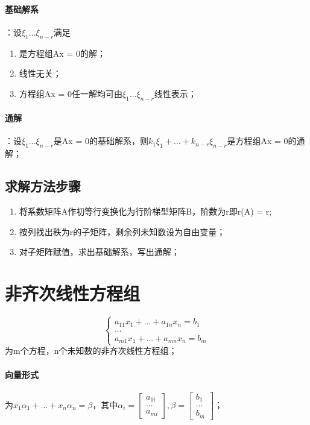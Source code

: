 \paragraph{基础解系}
：设\(\xi_1...\xi_{n - r}\)满足\begin{enumerate}
    \item 是方程组Ax = 0的解；
    \item 线性无关；
    \item 方程组Ax = 0任一解均可由\(\xi_1...\xi_{n - r}\)线性表示；
\end{enumerate}

\paragraph{通解}
：设\(\xi_1...\xi_{n - r}\)是Ax = 0的基础解系，则\(k_1\xi_1 + ... + k_{n - r}\xi_{n - r}\)是方程组Ax = 0的通解；

\subsection{求解方法步骤}
\begin{enumerate}
    \item 将系数矩阵A作初等行变换化为行阶梯型矩阵B，阶数为r即r(A) = r;
    \item 按列找出秩为r的子矩阵，剩余列未知数设为自由变量；
    \item 对子矩阵赋值，求出基础解系，写出通解；
\end{enumerate}





\section{非齐次线性方程组}
\[\begin{cases}
    a_{11}x_1 + ... + a_{1n}x_n = b_1 \\ 
    ... \\ 
    a_{m1}x_1 + ... + a_{mn}x_n = b_m
\end{cases}\]
为m个方程，n个未知数的非齐次线性方程组；

\paragraph{向量形式}
为\(x_1\alpha_1 + ... + x_n\alpha_n = \beta\)，其中\(\alpha_i = \begin{bmatrix}
    a_{1i} \\ 
    ... \\ 
    a_{mi}
\end{bmatrix}, \beta = \begin{bmatrix}
    b_1 \\ 
    ... \\ 
    b_m
\end{bmatrix}\)；

